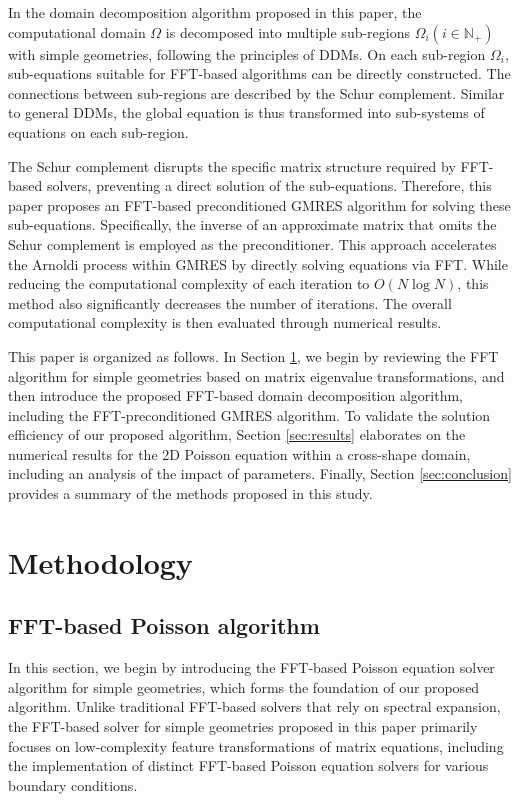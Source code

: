\documentclass[preprint]{elsarticle}
\begin{document}
In the domain decomposition algorithm proposed in this paper, the computational domain $\Omega$ is decomposed into multiple sub-regions $\Omega_i\left(i\in\mathbb{N}_+\right)$ with simple geometries, following the principles of DDMs. On each sub-region $\Omega_i$, sub-equations suitable for FFT-based algorithms can be directly constructed. The connections between sub-regions are described by the Schur complement.\cite{schur1917potenzreihen} Similar to general DDMs, the global equation is thus transformed into sub-systems of equations on each sub-region. 

The Schur complement disrupts the specific matrix structure required by FFT-based solvers, preventing a direct solution of the sub-equations. Therefore, this paper proposes an FFT-based preconditioned GMRES algorithm for solving these sub-equations. Specifically, the inverse of an approximate matrix that omits the Schur complement is employed as the preconditioner. This approach accelerates the Arnoldi process within GMRES by directly solving equations via FFT. While reducing the computational complexity of each iteration to $O\left(N \log N\right)$, this method also significantly decreases the number of iterations. The overall computational complexity is then evaluated through numerical results.

This paper is organized as follows. In Section \ref{sec:method}, we begin by reviewing the FFT algorithm for simple geometries based on matrix eigenvalue transformations, and then introduce the proposed FFT-based domain decomposition algorithm, including the FFT-preconditioned GMRES algorithm. To validate the solution efficiency of our proposed algorithm, Section \ref{sec:results} elaborates on the numerical results for the 2D Poisson equation within a cross-shape domain, including an analysis of the impact of parameters. Finally, Section \ref{sec:conclusion} provides a summary of the methods proposed in this study.

\section{Methodology}
\label{sec:method}
\subsection{FFT-based Poisson algorithm}
\label{ssec:FFT}
In this section, we begin by introducing the FFT-based Poisson equation solver algorithm for simple geometries, which forms the foundation of our proposed algorithm. Unlike traditional FFT-based solvers that rely on spectral expansion, the FFT-based solver for simple geometries proposed in this paper primarily focuses on low-complexity feature transformations of matrix equations, including the implementation of distinct FFT-based Poisson equation solvers for various boundary conditions.
\end{document}
